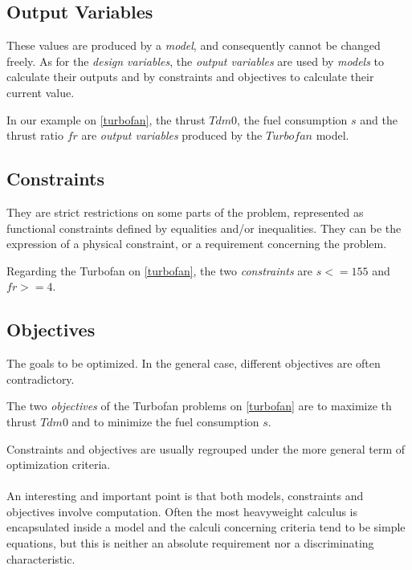 \subsection{Output Variables}

These values are produced by a \emph{model}, and consequently cannot be changed freely.
As for the \emph{design variables}, the \emph{output variables} are used by \emph{models} to calculate their outputs and by constraints and objectives to calculate their current value.

In our example on \figurename{} \ref{turbofan}, the thrust $Tdm0$, the fuel consumption $s$ and the thrust ratio $fr$ are \emph{output variables} produced by the $Turbofan$ model.

\subsection{Constraints}

They are strict restrictions on some parts of the problem, represented as functional constraints defined by equalities and/or inequalities. They can be the expression of a physical constraint, or a requirement concerning the problem.

Regarding the Turbofan on \figurename{} \ref{turbofan}, the two \emph{constraints} are $s <= 155$ and $fr >=4$.

\subsection{Objectives}

The goals to be optimized. In the general case, different objectives are often contradictory.

The two \emph{objectives} of the Turbofan problems on \figurename{} \ref{turbofan} are to maximize th thrust $Tdm0$ and to minimize the fuel consumption $s$.

Constraints and objectives are usually regrouped under the more general term of optimization criteria. 

\paragraph*{}
An interesting and important point is that both models, constraints and objectives involve computation. Often the most heavyweight calculus is encapsulated inside a model and the calculi concerning criteria tend to be simple equations, but this is neither an absolute requirement nor a discriminating characteristic.

